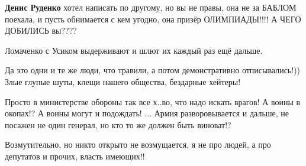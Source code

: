 \begin{itemize}
\begin{itemize}
 
\textbf{Денис Руденко} хотел написать по другому, но вы не правы, она не за БАБЛОМ поехала, и пусть обнимается с кем угодно, она призёр ОЛИМПИАДЫ!!!! А ЧЕГО ДОБИЛИСЬ вы????
\end{itemize}

 
Ломаченко с Усиком выдерживают и шлют их каждый раз ещё дальше.

 

Да это одни и те же люди, что травили, а потом демонстративно отписывались!))
Злые глупые шуты, клещи нашего общества, бездарные хейтеры!


 

Просто в министерстве обороны так все х..во, что надо искать врагов! А воины в
окопах!? А воины могут и подождать! ... Армия разворовывается и дальше, не
посажен не один генерал, но кто то же должен быть виноват!?


 

Возмутительно, но никто открыто не возмущается, я не про людей, а про депутатов
и прочих, власть имеющих!!

\begin{itemize}
 

\end{itemize}
\end{itemize}
